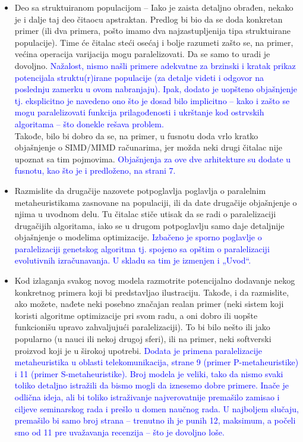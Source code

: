 \documentclass[a4paper]{report}
\newcommand{\odgovor}[1]{\textcolor{blue}{#1}}
\begin{document}
\begin{itemize}
    \item  Deo sa struktuiranom populacijom -- Iako je zaista detaljno obrađen, nekako je i dalje taj deo čitaocu apstraktan. Predlog bi bio da se doda konkretan primer (ili dva primera, pošto imamo dva najzastupljenija tipa struktuirane populacije). Time će čitalac steći osećaj i bolje razumeti zašto se, na primer, većina operacija varijacija mogu paralelizovati. Da se samo to uradi je dovoljno. \odgovor{Nažalost, nismo našli primere adekvatne za brzinski i kratak prikaz potencijala struktu(r)irane populacije (za detalje videti i odgovor na poslednju zamerku u ovom nabranjaju). Ipak, dodato je uopšteno objašnjenje tj. eksplicitno je navedeno ono što je dosad bilo implicitno -- kako i zašto se mogu paralelizovati funkcija prilagođenosti i ukrštanje kod ostrvskih algoritama -- što donekle rešava problem.} \\
     Takođe, bilo bi dobro da se, na primer, u fusnotu doda vrlo kratko objašnjenje o SIMD/MIMD računarima, jer možda neki drugi čitalac nije upoznat sa tim pojmovima. \odgovor{Objašnjenja za ove dve arhitekture su dodate u fusnotu, kao što je i predloženo, na strani 7.}
     
     \item Razmislite da drugačije nazovete potpoglavlja poglavlja o paralelnim metaheuristikama zasnovane na populaciji, ili da date drugačije objašnjenje o njima u uvodnom delu. Tu čitalac stiče utisak da se radi o paralelizaciji drugačijih algoritama, iako se u drugom potpoglavlju samo daje detaljnije objašnjenje o modelima optimizacije. \odgovor{Izbačeno je sporno poglavlje o paralelizaciji genetskog algoritma tj. spojeno sa opštim o paralelizaciji evolutivnih izračunavanja. U skladu sa tim je izmenjen i „Uvod“.}
     
     \item
     Kod izlaganja svakog novog modela razmotrite potencijalno dodavanje nekog konkretnog primera koji bi predstavljao ilustraciju. Takođe, i da razmislite, ako možete, nađete neki posebno značajan realan primer (neki sistem koji koristi algoritme optimizacije pri svom radu, a oni dobro ili uopšte funkcionišu upravo zahvaljujući paralelizaciji). To bi bilo nešto ili jako popularno (u nauci ili nekoj drugoj sferi), ili na primer, neki softverski proizvod koji je u širokoj upotrebi. \odgovor{Dodata je primena paralelizacije metaheuristika u oblasti telekomunikacija, strane 9 (primer P-metaheuristike) i 11 (primer S-metaheuristike). Broj modela je veliki, tako da nismo svaki toliko detaljno istražili da bismo mogli da iznesemo dobre primere. Inače je odlična ideja, ali bi toliko istraživanje najverovatnije premašilo zamisao i ciljeve seminarskog rada i prešlo u domen naučnog rada. U najboljem slučaju, premašilo bi samo broj strana -- trenutno ih je punih 12, maksimum, a počeli smo od 11 pre uvažavanja recenzija -- što je dovoljno loše.}
\end{itemize}
\end{document}
